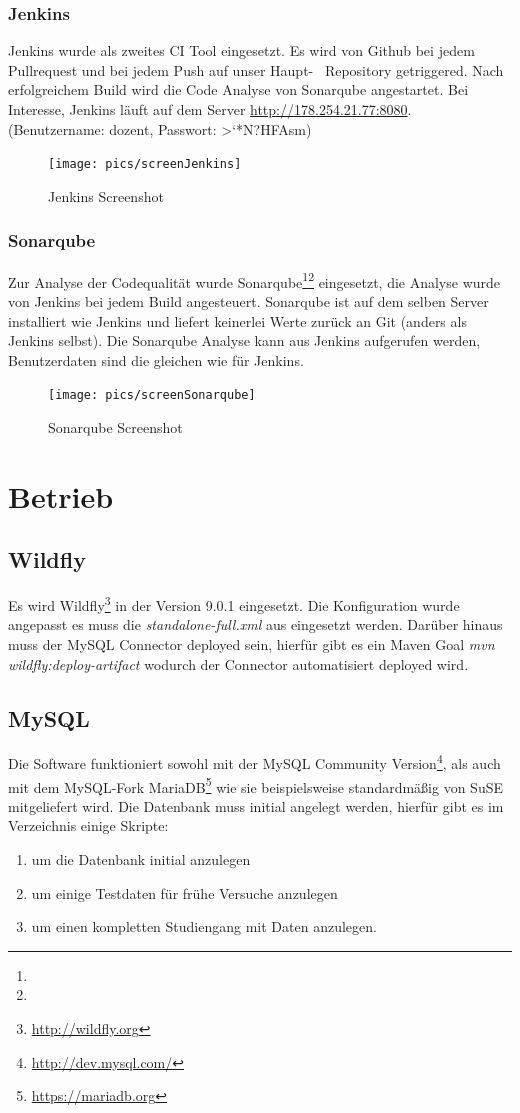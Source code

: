 \documentclass[12pt,a4paper,parskip]{scrreprt}
\begin{document}
\subsubsection{Jenkins}
Jenkins wurde als zweites CI Tool eingesetzt. Es wird von Github bei jedem Pullrequest und bei jedem Push auf unser \glqq Haupt- \grqq\ Repository getriggered. Nach erfolgreichem Build wird die Code Analyse von Sonarqube angestartet. Bei Interesse, Jenkins läuft auf dem Server \url{http://178.254.21.77:8080}. (Benutzername: dozent, Passwort: >`*N?HFAsm)
\begin{figure}[!hbtp]%
\centering
\texttt{[image: pics/screenJenkins]}
\caption[Jenkins]{Jenkins Screenshot}
\label{fig:screenJenkins}
\end{figure}
\subsubsection{Sonarqube}
Zur Analyse der Codequalität wurde Sonarqube\footnote{}\footnote{} eingesetzt, die Analyse wurde von Jenkins bei jedem Build angesteuert. Sonarqube ist auf dem selben Server installiert wie Jenkins und liefert keinerlei Werte zurück an Git (anders als Jenkins selbst). Die Sonarqube Analyse kann aus Jenkins aufgerufen werden, Benutzerdaten sind die gleichen wie für Jenkins.
\begin{figure}[!hbtp]%
\centering
\texttt{[image: pics/screenSonarqube]}
\caption[Sonarqube]{Sonarqube Screenshot}
\label{fig:screenSonarqube}
\end{figure}
\section{Betrieb}
\subsection{Wildfly}
Es wird Wildfly\footnote{\url{http://wildfly.org}} in der Version 9.0.1 eingesetzt. Die Konfiguration wurde angepasst es muss die \textit{standalone-full.xml} aus  eingesetzt werden. Darüber hinaus muss der MySQL Connector deployed sein, hierfür gibt es ein Maven Goal \textit{mvn wildfly:deploy-artifact} wodurch der Connector automatisiert deployed wird.
\subsection{MySQL}
Die Software funktioniert sowohl mit der MySQL Community Version\footnote{\url{http://dev.mysql.com/}}, als auch mit dem MySQL-Fork MariaDB\footnote{\url{https://mariadb.org}} wie sie beispielsweise standardmäßig von SuSE mitgeliefert wird.
Die Datenbank muss initial angelegt werden, hierfür gibt es im Verzeichnis  einige Skripte:
\begin{enumerate}
	\item {} um die Datenbank initial anzulegen
	\item {} um einige Testdaten für frühe Versuche anzulegen
	\item {} um einen kompletten Studiengang mit Daten anzulegen.
\end{enumerate}
\end{document}
